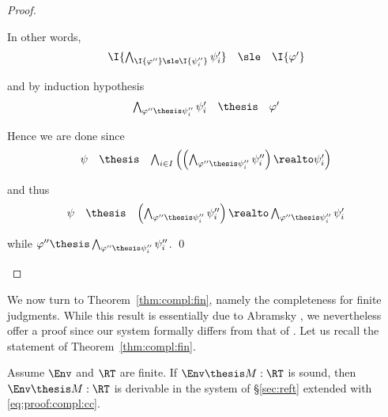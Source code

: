 \begin{proof}
\begin{description}
\noindent
In other words,
\[
\begin{array}{l l l}
  \I{\bigwedge_{\I{\varphi''} \sle \I{\psi ''_i}} \psi'_i}
& \sle
& \I{\varphi'}
\end{array}
\]

\noindent
and by induction hypothesis
\[
\begin{array}{l l l}
  \bigwedge_{\varphi'' \thesis \psi ''_i} \psi'_i
& \thesis
& \varphi'
\end{array}
\]

Hence we are done since
\[
\begin{array}{l l l}
  \psi
& \thesis
& \bigwedge_{i \in I} \left(
  \left( \bigwedge_{\varphi'' \thesis \psi ''_i} \psi''_i \right)
  \realto
  \psi'_i
  \right)
\end{array}
\]

\noindent
and thus
\[
\begin{array}{l l l}
  \psi
& \thesis
& \left( \bigwedge_{\varphi'' \thesis \psi ''_i} \psi''_i \right)
  \realto
  \bigwedge_{\varphi'' \thesis \psi ''_i} \psi'_i
\end{array}
\]

\noindent
while
\(
\varphi'' \thesis \bigwedge_{\varphi'' \thesis \psi ''_i} \psi''_i
\).
\qed
\end{description}
\end{proof}


We now turn to Theorem~\ref{thm:compl:fin},
namely the completeness for finite judgments.
While this result is essentially due to Abramsky \cite{abramsky91apal},
we nevertheless offer a proof since our system formally
differs from that of \cite{abramsky91apal}.
Let us recall the statement of Theorem~\ref{thm:compl:fin}.

\begin{theorem}
\label{thm:proof:compl:fin}
Assume $\Env$ and  $\RT$ are finite.
If $\Env \thesis M : \RT$ is sound,
then $\Env \thesis M : \RT$ is derivable in the system of \S\ref{sec:reft}
extended with \eqref{eq:proof:compl:cc}.
\end{theorem}


